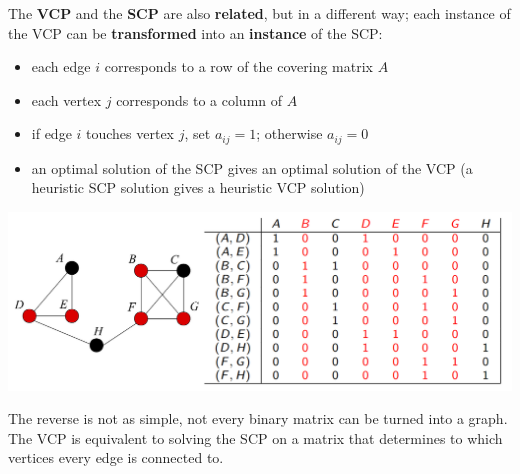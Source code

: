 The \textbf{VCP} and the \textbf{SCP} are also \textbf{related}, but in a different way; each instance of the VCP can be \textbf{transformed} into an \textbf{instance} of the SCP:
\begin{itemize}
	\item each edge $i$ corresponds to a row of the covering matrix $A$
	\item each vertex $j$ corresponds to a column of $A$
	\item if edge $i$ touches vertex $j$, set $a_{ij} = 1$; otherwise $a_{ij} = 0$
	\item an optimal solution of the SCP gives an optimal solution of the VCP (a heuristic SCP solution gives a heuristic VCP solution)
\end{itemize}
\begin{center}
	\includegraphics[width=\columnwidth]{img/interlude52}
\end{center}
The reverse is not as simple, not every binary matrix can be turned into a graph.\\

The VCP is equivalent to solving the SCP on a matrix that determines to which vertices every edge is connected to.\\

\newpage

